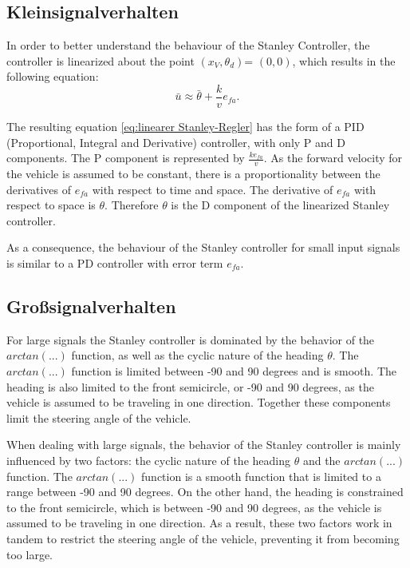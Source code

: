 \documentclass[arbeit=studie,oneside,BCOR=12mm]{ArbeitRST}
\begin{document}
\subsection{Kleinsignalverhalten}

In order to better understand the behaviour of the Stanley Controller, the
controller is linearized about the point \(\left(x_V, \theta_d\right)\)=
\(\left(0, 0\right)\), which results in the following equation:
\begin{equation} 
    \bar{u} \approx \bar{\theta} + \frac{k}{v}e_{fa}.
    \label{eq:linearer Stanley-Regler} 
\end{equation}

The resulting equation \eqref{eq:linearer Stanley-Regler} has the form of a PID
(Proportional, Integral and Derivative) controller, with only P and D
components. The P component is represented by \(\frac{ke_{fa}}{v}\). As the
forward velocity for the vehicle is assumed to be constant, there is a
proportionality between the derivatives of \(e_{fa}\) with respect to time and
space. The derivative of \(e_{fa}\) with respect to space is \(\theta\).
Therefore \(\theta\) is the D component of the linearized Stanley controller.

As a consequence, the behaviour of the Stanley controller for small input
signals is similar to a PD controller with error term \(e_{fa}\). 

\subsection{Gro{\ss}signalverhalten}

For large signals the Stanley controller is dominated by the behavior of the
\(arctan(...)\) function, as well as the cyclic nature of the heading
\(\theta\). The \(arctan(...)\) function is limited between -90 and 90 degrees
and is smooth. The heading is also limited to the front semicircle, or -90 and
90 degrees, as the vehicle is assumed to be traveling in one direction.
Together these components limit the steering angle of the vehicle.

\iffalse

When dealing with large signals, the behavior of the Stanley controller is
mainly influenced by two factors: the cyclic nature of the heading \(\theta\)
and the \(arctan(...)\) function. The \(arctan(...)\) function is a smooth
function that is limited to a range between -90 and 90 degrees. On the other
hand, the heading is constrained to the front semicircle, which is between -90
and 90 degrees, as the vehicle is assumed to be traveling in one direction. As
a result, these two factors work in tandem to restrict the steering angle of
the vehicle, preventing it from becoming too large.
\end{document}

